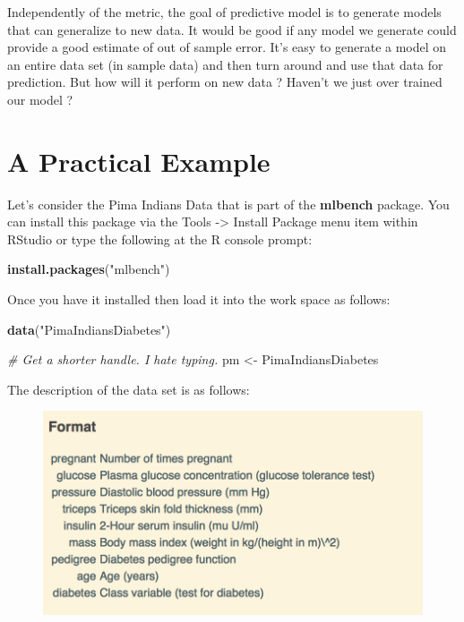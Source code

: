 \documentclass[]{book}
\newenvironment{Shaded}{\begin{snugshade}}{\end{snugshade}}
\newcommand{\KeywordTok}[1]{\textcolor[rgb]{0.13,0.29,0.53}{\textbf{#1}}}
\newcommand{\StringTok}[1]{\textcolor[rgb]{0.31,0.60,0.02}{#1}}
\newcommand{\CommentTok}[1]{\textcolor[rgb]{0.56,0.35,0.01}{\textit{#1}}}
\newcommand{\NormalTok}[1]{#1}
\begin{document}
Independently of the metric, the goal of predictive model is to generate
models that can generalize to new data. It would be good if any model we
generate could provide a good estimate of out of sample error. It's easy
to generate a model on an entire data set (in sample data) and then turn
around and use that data for prediction. But how will it perform on new
data ? Haven't we just over trained our model ?

\chapter{A Practical Example}\label{a-practical-example}

Let's consider the Pima Indians Data that is part of the
\textbf{mlbench} package. You can install this package via the Tools
-\textgreater{} Install Package menu item within RStudio or type the
following at the R console prompt:

\begin{Shaded}
\begin{Highlighting}[]
\KeywordTok{install.packages}\NormalTok{(}\StringTok{"mlbench"}\NormalTok{)}
\end{Highlighting}
\end{Shaded}

Once you have it installed then load it into the work space as follows:

\begin{Shaded}
\begin{Highlighting}[]
\KeywordTok{data}\NormalTok{(}\StringTok{"PimaIndiansDiabetes"}\NormalTok{)}

\CommentTok{# Get a shorter handle. I hate typing. }
\NormalTok{pm <-}\StringTok{ }\NormalTok{PimaIndiansDiabetes}
\end{Highlighting}
\end{Shaded}

The description of the data set is as follows:

\begin{figure}
\centering
\includegraphics[width=4.94792in]{./PICS/pima_desc.png}
\caption{}
\end{figure}
\end{document}
